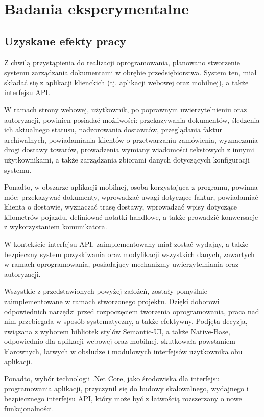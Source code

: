 \chapter{Badania eksperymentalne}
\section{Uzyskane efekty pracy}
Z chwilą przystąpienia do realizacji oprogramowania, planowano stworzenie systemu zarządzania dokumentami w obrębie przedsiębiorstwa. System ten, miał składać się z aplikacji klienckich (tj. aplikacji webowej oraz mobilnej), a także interfejsu API.

W ramach strony webowej, użytkownik, po poprawnym uwierzytelnieniu oraz autoryzacji, powinien posiadać możliwości: przekazywania dokumentów, śledzenia ich aktualnego statusu, nadzorowania dostawców, przeglądania faktur archiwalnych, powiadamiania klientów o przetwarzaniu zamówienia, wyznaczania drogi dostawy towarów, prowadzenia wymiany wiadomości tekstowych z innymi użytkownikami, a także zarządzania zbiorami danych dotyczących konfiguracji systemu.

Ponadto, w obszarze aplikacji mobilnej, osoba korzystająca z programu, powinna móc: przekazywać dokumenty, wprowadzać uwagi dotyczące faktur, powiadamiać klienta o dostawie, wyznaczać trasę dostawy, wprowadzać wpisy dotyczące kilometrów pojazdu, definiować notatki handlowe, a także prowadzić konwersacje z wykorzystaniem komunikatora.

W kontekście interfejsu API, zaimplementowany miał zostać wydajny, a także bezpieczny system pozyskiwania oraz modyfikacji wszystkich danych, zawartych w ramach oprogramowania, posiadający mechanizmy uwierzytelniania oraz autoryzacji.

Wszystkie z przedstawionych powyżej założeń, zostały pomyślnie zaimplementowane w ramach stworzonego projektu. Dzięki doborowi odpowiednich narzędzi przed rozpoczęciem tworzenia oprogramowania, praca nad nim przebiegała w sposób systematyczny, a także efektywny. Podjęta decyzja, związana z wyborem bibliotek stylów Semantic-UI, a także Native-Base, odpowiednio dla aplikacji webowej oraz mobilnej, skutkowała powstaniem klarownych, łatwych w obsłudze i modułowych interfejsów użytkownika obu aplikacji.

Ponadto, wybór technologii .Net Core, jako środowiska dla interfejsu programowania aplikacji, przyczynił się do budowy skalowalnego, wydajnego i bezpiecznego interfejsu API, który może być z łatwością rozszerzany o nowe funkcjonalności.

